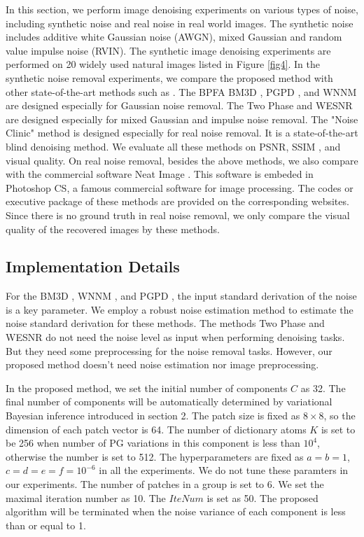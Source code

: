 \documentclass[runningheads]{llncs}
\begin{document}
In this section, we perform image denoising experiments on various types of noise, including synthetic noise and real noise in real world images. The synthetic noise includes additive white Gaussian noise (AWGN), mixed Gaussian and random value impulse noise (RVIN). The synthetic image denoising experiments are performed on 20 widely used natural images listed in Figure \ref{fig4}. In the synthetic noise removal experiments, we compare the proposed method with other state-of-the-art methods such as \cite{bpfa,bm3d,pgpd,wnnm,cai2010fast,wesnr,noiseclinic}. The BPFA \cite{bpfa} BM3D \cite{bm3d}, PGPD \cite{pgpd}, and WNNM \cite{wnnm} are designed especially for Gaussian noise removal. The Two Phase \cite{cai2010fast} and WESNR \cite{wesnr} are designed especially for mixed Gaussian and impulse noise removal. The "Noise Clinic" method \cite{noiseclinic} is designed especially for real noise removal. It is a state-of-the-art blind denoising method. We evaluate all these methods on PSNR, SSIM \cite{ssim}, and visual quality. On real noise removal, besides the above methods, we also compare with the commercial software Neat Image \cite{neatimage}. This software is embeded in Photoshop CS, a famous commercial software for image processing. The codes or executive package of these methods are provided on the corresponding websites. Since there is no ground truth in real noise removal, we only compare the visual quality of the recovered images by these methods.

\vspace{-0.15in}

\subsection{Implementation Details}
For the BM3D \cite{bm3d}, WNNM \cite{wnnm}, and PGPD \cite{pgpd}, the input standard derivation of the noise is a key parameter. We employ a robust noise estimation method \cite{liu2013single} to estimate the noise standard derivation for these methods. The methods Two Phase \cite{cai2010fast} and WESNR \cite{wesnr} do not need the noise level as input when performing denoising tasks. But they need some preprocessing for the noise removal tasks. However, our proposed method doesn't need noise estimation nor image preprocessing.

In the proposed method, we set the initial number of components $C$ as 32. The final number of components will be automatically determined by variational Bayesian inference introduced in section 2. The patch size is fixed as $8 \times 8$, so the dimension of each patch vector is 64. The number of dictionary atoms $K$ is set to be 256 when number of PG variations in this component is less than $10^4$, otherwise the number is set to 512. The hyperparameters are fixed as $a=b=1$, $c=d=e=f=10^{-6}$ in all the experiments. We do not tune these paramters in our experiments. The number of patches in a group is set to 6. We set the maximal iteration number as 10. The $IteNum$ is set as 50. The proposed algorithm will be terminated when the noise variance of each component is less than or equal to 1.
\end{document}
